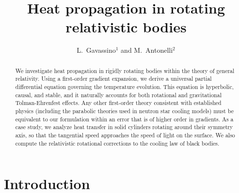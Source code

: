 \documentclass[a4paper, amsfonts, amssymb, amsmath, reprint, showkeys, nofootinbib, twoside, onecolumn,notitlepage]{revtex4-1}
\theoremstyle{definition}
\theoremstyle{theorem}
\begin{document}
\title{Heat propagation in rotating relativistic bodies}
\author{L.~Gavassino$^1$ and M.~Antonelli$^2$}

\begin{abstract}
We investigate heat propagation in rigidly rotating bodies within the theory of general relativity. Using a first-order gradient expansion, we derive a universal partial differential equation governing the temperature evolution. This equation is hyperbolic, causal, and stable, and it naturally accounts for both rotational and gravitational Tolman-Ehrenfest effects. Any other first-order theory consistent with established physics (including the parabolic theories used in neutron star cooling models) must be equivalent to our formulation within an error that is of higher order in gradients. As a case study, we analyze heat transfer in solid cylinders rotating around their symmetry axis, so that the tangential speed approaches the speed of light on the surface. We also compute the relativistic rotational corrections to the cooling law of black bodies.
\end{abstract} 

\maketitle
\section{Introduction}
\vspace{-0.4cm}
\end{document}
